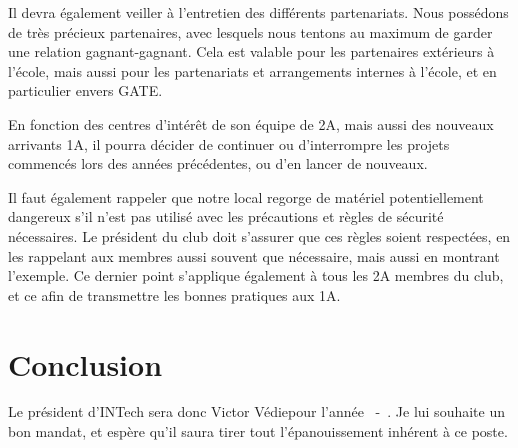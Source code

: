 \documentclass[a4paper,10pt]{article}
\newcommand{\nouveauprez}{Victor Védie}
\newcounter{annee}
\newcounter{anneesuiv}
\begin{document}
Il devra également veiller à l'entretien des différents partenariats. Nous possédons de très précieux partenaires, avec lesquels nous tentons au maximum 
de garder une relation gagnant-gagnant. Cela est valable pour les partenaires extérieurs à l'école, mais aussi pour les partenariats et arrangements internes 
à l'école, et en particulier envers GATE\texttrademark.\newline

En fonction des centres d'intérêt de son équipe de 2A, mais aussi des nouveaux arrivants 1A, il pourra décider de continuer ou d'interrompre les projets commencés 
lors des années précédentes, ou d'en lancer de nouveaux.\newline

Il faut également rappeler que notre local regorge de matériel potentiellement dangereux s'il n'est pas utilisé avec les précautions et règles de sécurité nécessaires.
Le président du club doit s'assurer que ces règles soient respectées, en les rappelant aux membres aussi souvent que nécessaire, mais aussi en montrant l'exemple.
Ce dernier point s'applique également à tous les 2A membres du club, et ce afin de transmettre les bonnes pratiques aux 1A.

\section{Conclusion}

Le président d'INTech sera donc \nouveauprez \space pour l'année \theannee~-~\theanneesuiv. Je lui souhaite un bon mandat, et espère qu'il saura tirer tout l'épanouissement 
inhérent à ce poste.
\end{document}
